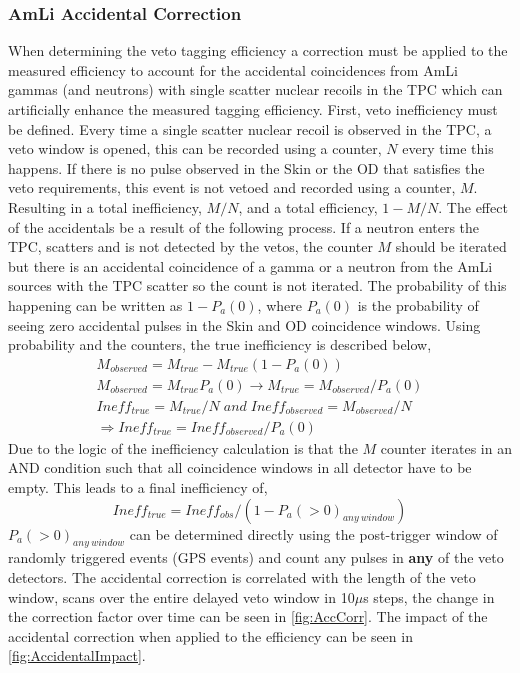 \subsubsection{AmLi Accidental Correction}\label{sec:AmLiAccCorrection}
When determining the veto tagging efficiency a correction must be applied to the measured efficiency to account for the accidental coincidences from AmLi gammas (and neutrons) with single scatter nuclear recoils in the TPC which can artificially enhance the measured tagging efficiency.
First, veto inefficiency must be defined. Every time a single scatter nuclear recoil is observed in the TPC, a veto window is opened, this can be recorded using a counter, $N$ every time this happens.
If there is no pulse observed in the Skin or the OD that satisfies the veto requirements, this event is not vetoed and recorded using a counter, $M$. Resulting in a total inefficiency, $M/N$, and a total efficiency, $1-M/N$.
The effect of the accidentals be a result of the following process.
If a neutron enters the TPC, scatters and is not detected by the vetos, the counter $M$ should be iterated but there is an accidental coincidence of a gamma or a neutron from the AmLi sources with the TPC scatter so the count is not iterated.
The probability of this happening can be written as $1-P_a(0)$, where $P_a(0)$ is the probability of seeing zero accidental pulses in the Skin and OD coincidence windows.
Using probability and the counters, the true inefficiency is described below,
\begin{gather*}
	M_{observed}=M_{true}-M_{true}(1-P_a(0)) \\
	M_{observed}=M_{true}P_a(0)\rightarrow M_{true}=M_{observed}/P_a(0)\\
	Ineff_{true}=M_{true}/N\;and\;Ineff_{observed}=M_{observed}/N\\
	\Rightarrow Ineff_{true}=Ineff_{observed}/P_a(0)
\end{gather*}
Due to the logic of the inefficiency calculation is that the $M$ counter iterates in an AND condition such that all coincidence windows in all detector have to be empty.
This leads to a final inefficiency of,
\begin{equation}
	Ineff_{true} = Ineff_{obs}  / (1 - P_a(>0)_{any\:window})
\end{equation}
$P_a(>0)_{any\:window}$ can be determined directly using the post-trigger window of randomly triggered events (GPS events) and count any pulses in \textbf{any} of the veto detectors.
The accidental correction is correlated with the length of the veto window, scans over the entire delayed veto window in 10$\mu$s steps, the change in the correction factor over time can be seen in \autoref{fig:AccCorr}.
The impact of the accidental correction when applied to the efficiency can be seen in \autoref{fig:AccidentalImpact}.

